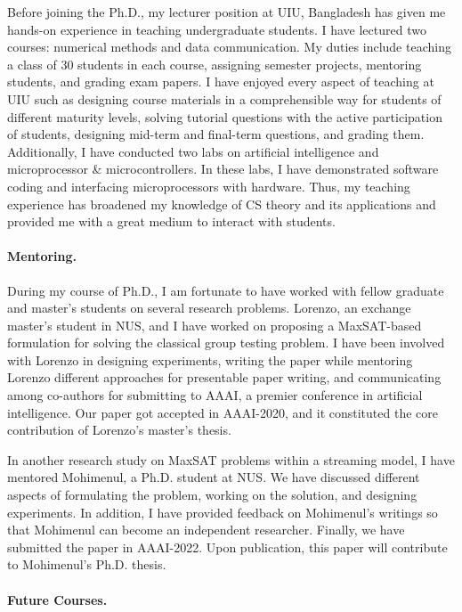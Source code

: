 \documentclass[11pt]{article}
\begin{document}
		
		Before joining the Ph.D., my lecturer position at UIU, Bangladesh has given me hands-on experience in teaching undergraduate students. I have lectured two courses: numerical methods and data communication. My duties include teaching a class of 30 students in each course, assigning semester projects, mentoring students, and grading exam papers.  I have enjoyed every aspect of teaching at UIU such as designing course materials in a comprehensible way for students of different maturity levels, solving tutorial questions with the active participation of students, designing mid-term and final-term questions, and grading them. Additionally, I have conducted two labs on artificial intelligence and microprocessor \& microcontrollers. In these labs, I have demonstrated software coding and interfacing microprocessors with hardware. Thus, my teaching experience has broadened my knowledge of CS theory and its applications and provided me with a great medium to interact with students. 
		
		
	\paragraph{Mentoring.}
	
		During my course of Ph.D., I am fortunate to have worked with fellow graduate and master's students on several research problems. Lorenzo, an exchange master's student in NUS, and I have worked on proposing a MaxSAT-based formulation for solving the classical group testing problem. I have been involved with Lorenzo in designing experiments, writing the paper while mentoring Lorenzo different approaches for presentable paper writing, and communicating among co-authors for submitting to AAAI, a premier conference in artificial intelligence. Our paper got accepted in AAAI-2020, and it constituted the core contribution of Lorenzo's master's thesis.
		
		In another research study on MaxSAT problems within a streaming model, I have mentored Mohimenul, a Ph.D. student at NUS. We have discussed different aspects of formulating the problem, working on the solution, and designing experiments. In addition, I have provided feedback on Mohimenul's writings so that Mohimenul can become an independent researcher. Finally, we have submitted the paper in AAAI-2022. Upon publication, this paper will contribute to Mohimenul's Ph.D. thesis.

	
	\paragraph{Future Courses.}
	
\end{document}
